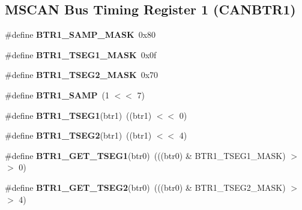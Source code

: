 \subsection*{M\+S\+C\+AN Bus Timing Register 1 (C\+A\+N\+B\+T\+R1)}
\begin{DoxyCompactItemize}
\item 
\mbox{\label{group__RTEMSBSPsPowerPCGen5200MSCAN_ga781753d57199a2cfe408343975bf39ce}} 
\#define {\bfseries B\+T\+R1\+\_\+\+S\+A\+M\+P\+\_\+\+M\+A\+SK}~0x80
\item 
\mbox{\label{group__RTEMSBSPsPowerPCGen5200MSCAN_ga8b4e8f007a8b362b1400731407febab5}} 
\#define {\bfseries B\+T\+R1\+\_\+\+T\+S\+E\+G1\+\_\+\+M\+A\+SK}~0x0f
\item 
\mbox{\label{group__RTEMSBSPsPowerPCGen5200MSCAN_gaa0dfca11124d0029b554b51f6f184465}} 
\#define {\bfseries B\+T\+R1\+\_\+\+T\+S\+E\+G2\+\_\+\+M\+A\+SK}~0x70
\item 
\mbox{\label{group__RTEMSBSPsPowerPCGen5200MSCAN_gab84336ae4e636773607f5d5ef2453ba7}} 
\#define {\bfseries B\+T\+R1\+\_\+\+S\+A\+MP}~(1 $<$$<$ 7)
\item 
\mbox{\label{group__RTEMSBSPsPowerPCGen5200MSCAN_ga28add8436b8b8a203667b6211131d849}} 
\#define {\bfseries B\+T\+R1\+\_\+\+T\+S\+E\+G1}(btr1)~((btr1) $<$$<$ 0)
\item 
\mbox{\label{group__RTEMSBSPsPowerPCGen5200MSCAN_ga9e991da73d9cd5233b85e6a04267cd25}} 
\#define {\bfseries B\+T\+R1\+\_\+\+T\+S\+E\+G2}(btr1)~((btr1) $<$$<$ 4)
\item 
\mbox{\label{group__RTEMSBSPsPowerPCGen5200MSCAN_ga6073138729af541ca3eb17a35ff304d1}} 
\#define {\bfseries B\+T\+R1\+\_\+\+G\+E\+T\+\_\+\+T\+S\+E\+G1}(btr0)~(((btr0) \& B\+T\+R1\+\_\+\+T\+S\+E\+G1\+\_\+\+M\+A\+SK) $>$$>$ 0)
\item 
\mbox{\label{group__RTEMSBSPsPowerPCGen5200MSCAN_gad52be66b94380bea3e3fe237f1a664d1}} 
\#define {\bfseries B\+T\+R1\+\_\+\+G\+E\+T\+\_\+\+T\+S\+E\+G2}(btr0)~(((btr0) \& B\+T\+R1\+\_\+\+T\+S\+E\+G2\+\_\+\+M\+A\+SK) $>$$>$ 4)
\end{DoxyCompactItemize}
